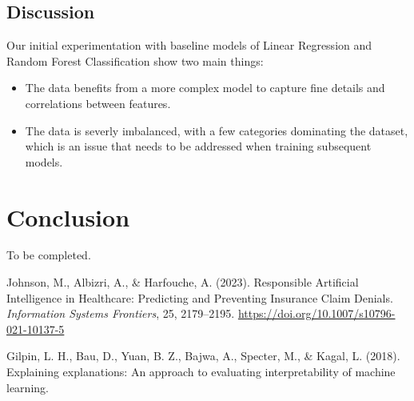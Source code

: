 \documentclass[final]{article}
\begin{document}
\subsection{Discussion}
Our initial experimentation with baseline models of Linear Regression and Random Forest Classification show two main things:
\begin{itemize}
  \item The data benefits from a more complex model to capture fine details and correlations between features.
  \item The data is severly imbalanced, with a few categories dominating the dataset, which is an issue that needs to be addressed when training subsequent models.
\end{itemize} 

\section{Conclusion}
To be completed.




\begin{thebibliography}{9}

Johnson, M., Albizri, A., \& Harfouche, A. (2023).
Responsible Artificial Intelligence in Healthcare: Predicting and Preventing Insurance Claim Denials.
\textit{Information Systems Frontiers}, 25, 2179–2195. \url{https://doi.org/10.1007/s10796-021-10137-5}

Gilpin, L. H., Bau, D., Yuan, B. Z., Bajwa, A., Specter, M., \& Kagal, L. (2018).
Explaining explanations: An approach to evaluating interpretability of machine learning.

\end{thebibliography}
\end{document}
